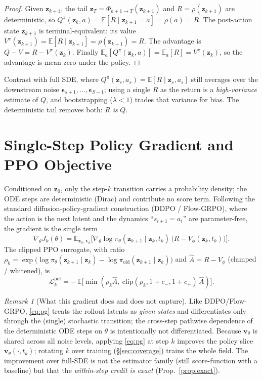 \documentclass[11pt]{article}
\theoremstyle{plain}
\theoremstyle{remark}
\newtheorem{remark}{Remark}
\newcommand{\zt}{\bm{z}}
\newcommand{\E}{\mathbb{E}}
\newcommand{\Vphi}{V_\phi}
\newcommand{\eps}{\bm{\epsilon}}
\begin{document}
\begin{proof}
Given $\zt_{k+1}$, the tail $\zt_T=\Phi_{k+1\to T}(\zt_{k+1})$ and $R=\rho(\zt_{k+1})$
are deterministic, so $Q^\pi(\zt_k,a)=\E[R\mid \zt_{k+1}=a]=\rho(a)=R$. The post-action
state $\zt_{k+1}$ is terminal-equivalent: its value
$V^\pi(\zt_{k+1})=\E[R\mid\zt_{k+1}]=\rho(\zt_{k+1})=R$. The advantage is
$Q-V=R-V^\pi(\zt_k)$. Finally $\E_a[Q^\pi(\zt_k,a)]=\E_a[R]=V^\pi(\zt_k)$, so the
advantage is mean-zero under the policy.
\end{proof}

Contrast with full SDE, where $Q^\pi(\zt_s,a_s)=\E[R\mid\zt_s,a_s]$ still averages over
the downstream noise $\eps_{s+1},\dots,\eps_{S-1}$; using a single $R$ as the return is a
\emph{high-variance} estimate of $Q$, and bootstrapping ($\lambda<1$) trades that
variance for bias. The deterministic tail removes both: $R$ \emph{is} $Q$.

\section{Single-Step Policy Gradient and PPO Objective}
\label{sec:pg}

Conditioned on $\zt_0$, only the step-$k$ transition carries a probability density; the
ODE steps are deterministic (Dirac) and contribute no score term. Following the standard
diffusion-policy-gradient construction (DDPO / Flow-GRPO), where the action is the next
latent and the dynamics ``$s_{i+1}=a_i$'' are parameter-free, the gradient is the single
term
\begin{equation}
\label{eq:pg}
\nabla_\theta J_k(\theta)
= \E_{\zt_0,\,\eps_k}\!\Big[\nabla_\theta\log\pi_\theta(\zt_{k+1}\mid\zt_k,t_k)\,
   \big(R-\Vphi(\zt_k,t_k)\big)\Big].
\end{equation}
The clipped PPO surrogate, with ratio $\rho_k=\exp\!\big(\log\pi_\theta(\zt_{k+1}\mid
\zt_k)-\log\pi_{\mathrm{old}}(\zt_{k+1}\mid\zt_k)\big)$ and $\hat A=R-\Vphi$ (clamped /
whitened), is
\begin{equation}
\label{eq:ppo}
\mathcal L^{\text{pol}}_k=-\,\E\big[\min(\rho_k\hat A,\ \mathrm{clip}(\rho_k,1{+}c_-,1{+}c_+)\,\hat A)\big].
\end{equation}

\begin{remark}[What this gradient does and does not capture]
Like DDPO/Flow-GRPO, \eqref{eq:pg} treats the rollout latents as \emph{given states} and
differentiates only through the (single) stochastic transition; the cross-step pathwise
dependence of the deterministic ODE steps on $\theta$ is intentionally not
differentiated. Because $\bm v_\theta$ is shared across all noise levels, applying
\eqref{eq:pg} at step $k$ improves the policy slice $\bm v_\theta(\cdot,t_k)$; rotating
$k$ over training (\S\ref{sec:coverage}) trains the whole field. The improvement over
full-SDE is not the estimator family (still score-function with a baseline) but that the
\emph{within-step credit is exact} (Prop.~\ref{prop:exact}).
\end{remark}
\end{document}
